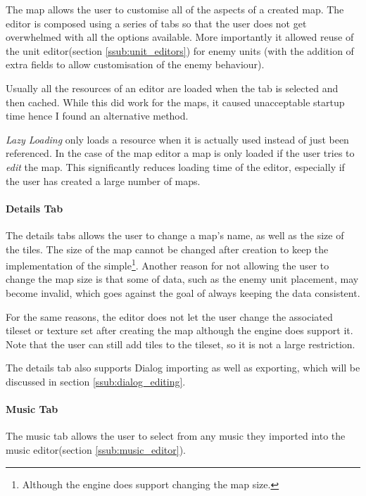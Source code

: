 The map allows the user to customise all of the aspects of a created map.  The editor is composed using a series of tabs so that the user does not get overwhelmed with all the options available. More importantly it allowed reuse of the unit editor(section \ref{ssub:unit_editors}) for enemy units (with the addition  of extra fields to allow customisation of the enemy behaviour).

Usually all the resources of an editor are loaded when the tab is selected and then cached.  While this did work for the maps, it caused unacceptable startup time hence I found an alternative method. 

\emph{Lazy Loading} only loads a resource when it is actually used instead of just been referenced\cite{Fowler:2002:PEA:579257}. In the case of the map editor a map is only loaded if the user tries to \emph{edit} the map. This significantly reduces loading time of the editor, especially if the user has created a large number of maps.

\paragraph{Details Tab\\}
The details tabs allows the user to change a map's name, as well as the size of the tiles.  The size of the map cannot be changed after creation to keep the implementation of the simple\footnote{Although the engine does support changing the map size.}. Another reason for not allowing the user to change the map size is that some of data, such as the enemy unit placement, may become invalid, which goes against the goal of always keeping the data consistent.  

For the same reasons, the editor does not let the user change the associated tileset or texture set after creating the map  although the engine does support it. Note that the user can still add tiles to the tileset, so it is not a large restriction.

The details tab also supports Dialog importing as well as exporting, which will be discussed in section \ref{ssub:dialog_editing}.

\paragraph{Music Tab\\}
The music tab allows the user to select from any music they imported into the music editor(section \ref{ssub:music_editor}).

